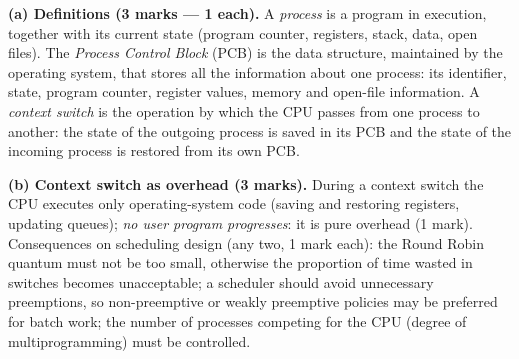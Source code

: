 \documentclass[11pt]{article}
\begin{document}
\begin{corrige}
\textbf{(a) Definitions (3 marks — 1 each).} A \emph{process} is a program in execution, together with its current state (program counter, registers, stack, data, open files). The \emph{Process Control Block} (PCB) is the data structure, maintained by the operating system, that stores all the information about one process: its identifier, state, program counter, register values, memory and open-file information. A \emph{context switch} is the operation by which the CPU passes from one process to another: the state of the outgoing process is saved in its PCB and the state of the incoming process is restored from its own PCB.

\textbf{(b) Context switch as overhead (3 marks).} During a context switch the CPU executes only operating-system code (saving and restoring registers, updating queues); \emph{no user program progresses}: it is pure overhead (1 mark). Consequences on scheduling design (any two, 1 mark each): the Round Robin quantum must not be too small, otherwise the proportion of time wasted in switches becomes unacceptable; a scheduler should avoid unnecessary preemptions, so non-preemptive or weakly preemptive policies may be preferred for batch work; the number of processes competing for the CPU (degree of multiprogramming) must be controlled.


\end{corrige}
\end{document}

